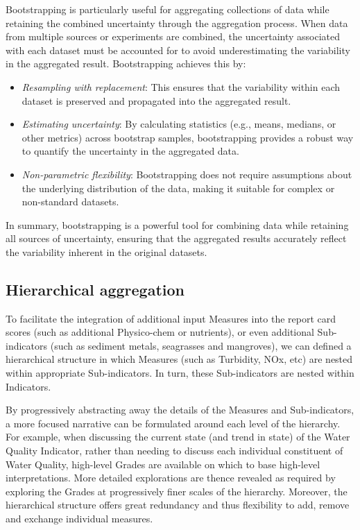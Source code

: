 \documentclass[
  8pt,
  a4paper]{article}
\providecommand{\tightlist}{%
  \setlength{\itemsep}{0pt}\setlength{\parskip}{0pt}}
\begin{document}
Bootstrapping is particularly useful for aggregating collections of data
while retaining the combined uncertainty through the aggregation
process. When data from multiple sources or experiments are combined,
the uncertainty associated with each dataset must be accounted for to
avoid underestimating the variability in the aggregated result.
Bootstrapping achieves this by:

\begin{itemize}
\tightlist
\item
  \emph{Resampling with replacement}: This ensures that the variability
  within each dataset is preserved and propagated into the aggregated
  result.
\item
  \emph{Estimating uncertainty}: By calculating statistics (e.g., means,
  medians, or other metrics) across bootstrap samples, bootstrapping
  provides a robust way to quantify the uncertainty in the aggregated
  data.
\item
  \emph{Non-parametric flexibility}: Bootstrapping does not require
  assumptions about the underlying distribution of the data, making it
  suitable for complex or non-standard datasets.
\end{itemize}

In summary, bootstrapping is a powerful tool for combining data while
retaining all sources of uncertainty, ensuring that the aggregated
results accurately reflect the variability inherent in the original
datasets.

\subsection{Hierarchical aggregation}\label{sec-hierAgg}

To facilitate the integration of additional input Measures into the
report card scores (such as additional Physico-chem or nutrients), or
even additional Sub-indicators (such as sediment metals, seagrasses and
mangroves), we can defined a hierarchical structure in which Measures
(such as Turbidity, NOx, etc) are nested within appropriate
Sub-indicators. In turn, these Sub-indicators are nested within
Indicators.

By progressively abstracting away the details of the Measures and
Sub-indicators, a more focused narrative can be formulated around each
level of the hierarchy. For example, when discussing the current state
(and trend in state) of the Water Quality Indicator, rather than needing
to discuss each individual constituent of Water Quality, high-level
Grades are available on which to base high-level interpretations. More
detailed explorations are thence revealed as required by exploring the
Grades at progressively finer scales of the hierarchy. Moreover, the
hierarchical structure offers great redundancy and thus flexibility to
add, remove and exchange individual measures.
\end{document}
